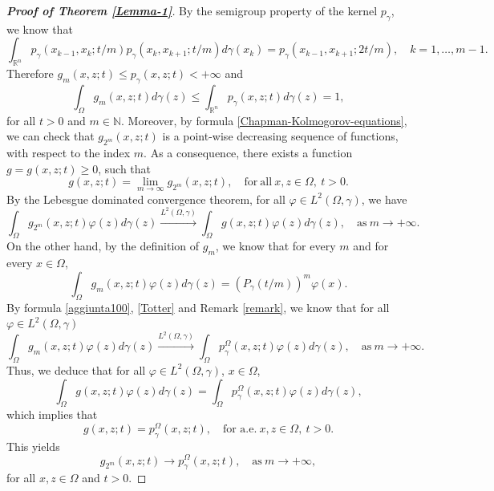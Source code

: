 \documentclass[12pt]{amsart}
\newcommand{\R}{\mathbb R}
\newcommand{\N}{\mathbb N}
\newcommand{\1}{\mathbf 1}
\begin{document}
\begin{proof}[\bf Proof of Theorem \ref{Lemma-1}]
By the semigroup property of the kernel $p_\gamma$, we know that
\begin{equation}\label{Chapman-Kolmogorov-equations}
\int_{\R^n} p_\gamma (x_{k-1},x_k;t/m) p_\gamma(x_k,x_{k+1};t/m)d\gamma(x_k)= p_\gamma(x_{k-1},x_{k+1};2t/m),\quad k=1,\ldots,m-1.
\end{equation}
Therefore $g_m (x,z;t) \leq p_\gamma (x,z;t)<+\infty$ and
\begin{equation}\label{aggiunta10}
\int_\Omega g_m (x,z;t)d\gamma(z) \leq \int_{\R^n} p_\gamma (x,z;t)d\gamma(z)=1,
\end{equation}
for all $t>0$ and $m\in \N$. Moreover, by formula \eqref{Chapman-Kolmogorov-equations}, we can check that $g_{2^m}(x,z;t)$ is a point-wise decreasing sequence of functions, with respect to the index $m$. As a consequence, there exists a function $g=g(x,z;t)\geq 0$, such that
\[
g(x,z;t)=\mathop{\lim}_{m \rightarrow \infty} g_{2^m}(x,z;t),\quad \mathrm{for\ all }\ x,z\in \Omega, \ t>0.
\]
By the Lebesgue dominated convergence theorem, for all $\varphi \in L^2(\Omega,\gamma)$, we have
\[
\int_\Omega g_{2^m} (x,z;t)\varphi (z)d\gamma(z) \xrightarrow{L^2(\Omega,\gamma)}\int_{\Omega} g(x,z;t)\varphi(z)d\gamma(z),\quad \mathrm{as}\ m\rightarrow +\infty.
\]
On the other hand, by the definition of $g_m$, we know that for every $m$ and for every $x\in \Omega$,
\begin{equation}\label{aggiunta100}
\int_\Omega g_{m} (x,z;t)\varphi (z)d\gamma(z)=(P_\gamma (t/m))^m\varphi(x).
\end{equation}
By formula \eqref{aggiunta100}, \eqref{Totter} and Remark \ref{remark}, we know that for all $\varphi \in L^2(\Omega,\gamma)$
\[
\int_\Omega g_{m} (x,z;t)\varphi (z)d\gamma(z) \xrightarrow{L^2(\Omega,\gamma)}\int_{\Omega} p^\Omega_\gamma(x,z;t)\varphi(z)d\gamma(z),\quad \mathrm{as}\ m\rightarrow +\infty.
\]
Thus, we deduce that for all $\varphi \in L^2(\Omega,\gamma)$, $x\in \Omega$,
\[
\int_{\Omega} g(x,z;t)\varphi(z)d\gamma(z)=\int_{\Omega} p^\Omega_\gamma(x,z;t)\varphi(z)d\gamma(z),
\]
which implies that
\[
g(x,z;t)=p^\Omega_\gamma(x,z;t),\quad \mbox{for\ a.e.}\ x,z\in \Omega,\ t>0.
\]
This yields
\[
g_{2^m} (x,z;t)\rightarrow p^\Omega_\gamma (x,z;t),\quad \mathrm{as}\ m\rightarrow +\infty,
\]
for all $x,z\in \Omega$ and $t>0$.


\end{proof}
\end{document}
